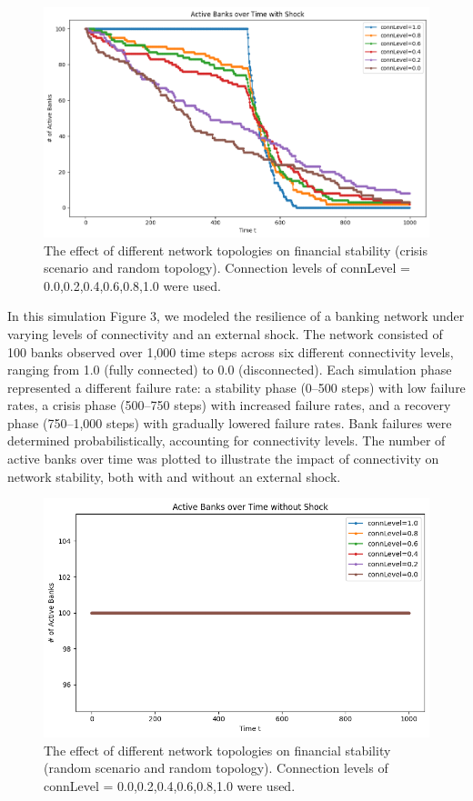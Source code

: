 \documentclass{article} %
\begin{document}
\begin{figure}[h]
    \centering
    \includegraphics[width=0.8\linewidth]{Figures/Figure_2_1.png}
    \caption{The effect of different network topologies on financial stability (crisis scenario and random topology). Connection levels of connLevel = 0.0,0.2,0.4,0.6,0.8,1.0 were used.}
    \label{fig:figure2.1}
\end{figure}
In this simulation Figure 3, we modeled the resilience of a banking network under varying levels of connectivity and an external shock. The network consisted of 100 banks observed over 1,000 time steps across six different connectivity levels, ranging from 1.0 (fully connected) to 0.0 (disconnected). Each simulation phase represented a different failure rate: a stability phase (0--500 steps) with low failure rates, a crisis phase (500--750 steps) with increased failure rates, and a recovery phase (750--1,000 steps) with gradually lowered failure rates. Bank failures were determined probabilistically, accounting for connectivity levels. The number of active banks over time was plotted to illustrate the impact of connectivity on network stability, both with and without an external shock.

\begin{figure}[h]
    \centering
    \includegraphics[width=0.8\linewidth]{Figures/Figure_2_2.png}
    \caption{The effect of different network topologies on financial stability (random scenario and random topology). Connection levels of connLevel = 0.0,0.2,0.4,0.6,0.8,1.0 were used.}
    \label{fig:figure2.2}
\end{figure}
\end{document}
